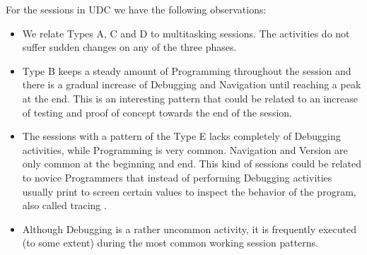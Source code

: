 For the sessions in UDC we have the following observations:
\begin{itemize}
	\item We relate Types A, C and D to multitasking sessions. The activities do not suffer sudden changes on any of the three phases.
	
	\item Type B keeps a steady amount of Programming throughout the session and there is a gradual increase of Debugging and Navigation until reaching a peak at the end. This is an interesting pattern that could be related to an increase of testing and proof of concept towards the end of the session.
	
	\item The sessions with a pattern of the Type E lacks completely of Debugging activities, while Programming is very common. Navigation and Version are only common at the beginning and end. This kind of sessions could be related to novice Programmers that instead of performing Debugging activities usually print to screen certain values to inspect the behavior of the program, also called tracing \cite{MKM08, AEH05}.
	
	\item Although Debugging is a rather uncommon activity, it is frequently executed (to some extent) during the most common working session patterns.
\end{itemize}
